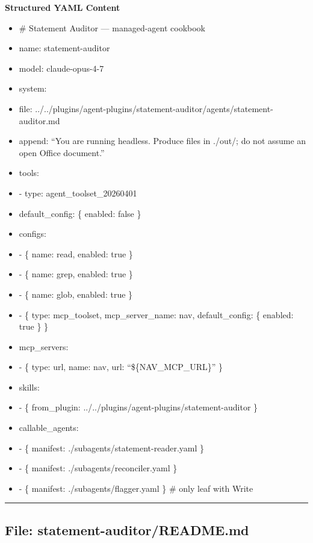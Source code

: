 \documentclass[11pt]{article}
\begin{document}
\textbf{Structured YAML Content}
\begin{itemize}[leftmargin=*,itemsep=2pt,topsep=2pt]
\item {} \# Statement Auditor — managed-agent cookbook
\item {} name: statement-auditor
\item {} model: claude-opus-4-7
\item {} system:
\item {} file: ../../plugins/agent-plugins/statement-auditor/agents/statement-auditor.md
\item {} append: ``You are running headless. Produce files in ./out/; do not assume an open Office document.''
\item {} tools:
\item {} - type: agent\_\allowbreak{}toolset\_\allowbreak{}20260401
\item {} default\_\allowbreak{}config: \{ enabled: false \}
\item {} configs:
\item {} - \{ name: read, enabled: true \}
\item {} - \{ name: grep, enabled: true \}
\item {} - \{ name: glob, enabled: true \}
\item {} - \{ type: mcp\_\allowbreak{}toolset, mcp\_\allowbreak{}server\_\allowbreak{}name: nav, default\_\allowbreak{}config: \{ enabled: true \} \}
\item {} mcp\_\allowbreak{}servers:
\item {} - \{ type: url, name: nav, url: ``\$\{NAV\_\allowbreak{}MCP\_\allowbreak{}URL\}'' \}
\item {} skills:
\item {} - \{ from\_\allowbreak{}plugin: ../../plugins/agent-plugins/statement-auditor \}
\item {} callable\_\allowbreak{}agents:
\item {} - \{ manifest: ./subagents/statement-reader.yaml \}
\item {} - \{ manifest: ./subagents/reconciler.yaml \}
\item {} - \{ manifest: ./subagents/flagger.yaml \} \# only leaf with Write
\end{itemize}

\vspace{0.8em}\hrule\vspace{0.8em}

\subsection{File: statement-auditor/README.md}\label{file:statement-auditor-README-md}
\end{document}
